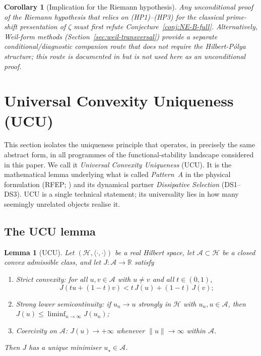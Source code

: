 \documentclass[11pt]{article}
\newtheorem{corollary}[theorem]{Corollary}
\newtheorem{lemma}[theorem]{Lemma}
\theoremstyle{definition}
\theoremstyle{remark}
\begin{document}
\begin{corollary}[Implication for the Riemann hypothesis]
\label{cor:rh-consequence}
Any unconditional proof of the Riemann hypothesis that relies on
(HP1)--(HP3) for the classical prime-shift presentation of $\zeta$
must first refute
Conjecture~\ref{conj:NE-B-full}. Alternatively, Weil-form methods
(Section~\ref{sec:weil-transversal}) provide a separate
conditional/diagnostic companion route that does not require the
Hilbert-P\'olya structure; this route is documented in
\cite{Geiger2026RHII} but is not used here as an unconditional proof.
\end{corollary}

\section{Universal Convexity Uniqueness (UCU)}
\label{sec:ucu}

This section isolates the uniqueness principle that operates, in
precisely the same abstract form, in all programmes of the
functional-stability landscape considered in this paper. We call
it \emph{Universal Convexity Uniqueness} (UCU). It is the
mathematical lemma underlying what is called \emph{Pattern~A} in
the physical formulation (RFEP; \cite{RFEPFramework}) and its
dynamical partner \emph{Dissipative Selection} (DS1--DS3). UCU is
a single technical statement; its universality lies in how many
seemingly unrelated objects realise it.

\subsection{The UCU lemma}
\label{sec:ucu-lemma}

\begin{lemma}[UCU]\label{lem:ucu}
Let $(\mathcal{H}, \langle\cdot,\cdot\rangle)$ be a real Hilbert
space, let $\mathcal{A} \subset \mathcal{H}$ be a closed convex
admissible class, and let $J : \mathcal{A} \to \mathbb{R}$ satisfy
\begin{enumerate}
\item[(C)] \emph{Strict convexity:} for all $u,v \in \mathcal{A}$
with $u \neq v$ and all $t \in (0,1)$,
\[
  J(tu + (1-t)v) < t\,J(u) + (1-t)\,J(v);
\]
\item[(L)] \emph{Strong lower semicontinuity:} if $u_n \to u$
strongly in $\mathcal{H}$ with $u_n, u \in \mathcal{A}$, then
$J(u) \leq \liminf_{n\to\infty} J(u_n)$;
\item[(K)] \emph{Coercivity on $\mathcal{A}$:} $J(u) \to +\infty$
whenever $\|u\| \to \infty$ within $\mathcal{A}$.
\end{enumerate}
Then $J$ has a unique minimiser $u_\star \in \mathcal{A}$.
\end{lemma}
\end{document}
